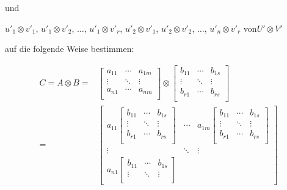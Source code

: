 \vspace{0.2cm}
\hspace{5cm}und 

\vspace{0.2cm}
\hspace{1cm}$u'_1\otimes v'_1$, $u'_1\otimes v'_2$, $\ldots$, $u'_1\otimes v'_r$, $u'_2\otimes v'_1$, $u'_2\otimes v'_2$, $\ldots$, $u'_n\otimes v'_r$ \quad von\quad $U'\otimes V'$

\vspace{0.2cm}
auf die folgende Weise bestimmen:

\begin{align*}
    C = A \otimes B =
    &\begin{bmatrix}
        a_{11} & \cdots & a_{1m} \\
        \vdots & \ddots  & \vdots \\
        a_{n1} & \cdots  & a_{nm} \\
    \end{bmatrix}
    \otimes
    \begin{bmatrix}
        b_{11} & \cdots & b_{1s} \\
        \vdots & \ddots  & \vdots \\
        b_{r1} & \cdots  & b_{rs} \\
    \end{bmatrix} \\[0.5cm]
    =
    &\begin{bmatrix}
        a_{11}\begin{bmatrix}
            b_{11} & \cdots & b_{1s} \\
            \vdots & \ddots  & \vdots \\
            b_{r1} & \cdots  & b_{rs} \\
        \end{bmatrix} 
        & \cdots & a_{1m}\begin{bmatrix}
            b_{11} & \cdots & b_{1s} \\
            \vdots & \ddots  & \vdots \\
            b_{r1} & \cdots  & b_{rs} \\
        \end{bmatrix}
         \\
        \vdots & \ddots  & \vdots \\
        a_{n1}\begin{bmatrix}
            b_{11} & \cdots & b_{1s} \\
            \vdots & \ddots  & \vdots \\

\end{bmatrix}
\end{bmatrix}
\end{align*}
